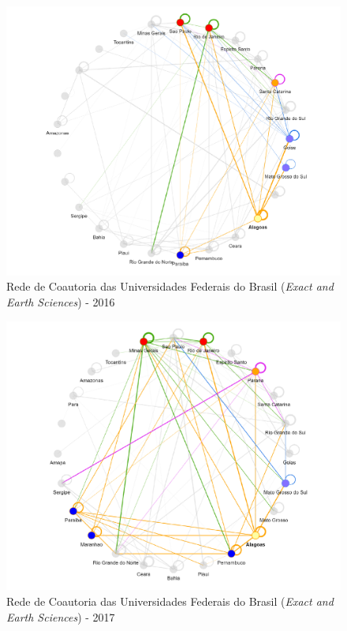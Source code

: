\begin{figure}[H]
	\centering
	\includegraphics[width=\linewidth]{Imagens/rede-exact-AL-2016.pdf}
	\caption{Rede de Coautoria das Universidades Federais do Brasil (\textit{Exact and Earth Sciences}) - 2016}
	\label{Rede de Coautoria - UF EXACT AL 2016}
\end{figure}

\begin{figure}[H]
	\centering
	\includegraphics[width=\linewidth]{Imagens/rede-exact-AL-2017.pdf}
	\caption{Rede de Coautoria das Universidades Federais do Brasil (\textit{Exact and Earth Sciences}) - 2017}
	\label{Rede de Coautoria - UF EXACT AL 2017}
\end{figure}